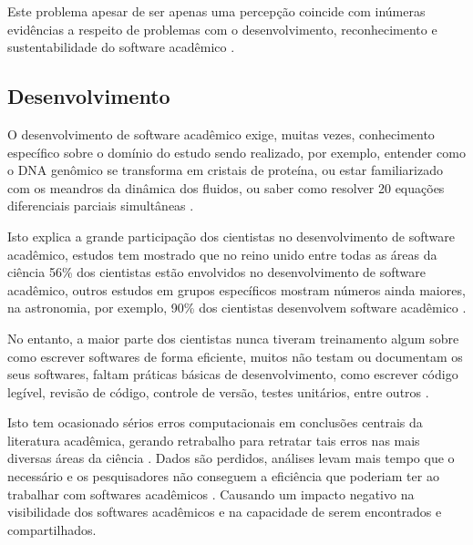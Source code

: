 Este problema apesar de ser apenas uma percepção coincide com inúmeras
evidências a respeito de problemas com o desenvolvimento, reconhecimento e
sustentabilidade do software acadêmico \cite{allen2017engineering}.


\subsection{Desenvolvimento}

O desenvolvimento de software acadêmico exige, muitas vezes, conhecimento
específico sobre o domínio do estudo sendo realizado,
por exemplo, entender como o DNA genômico
se transforma em cristais de proteína, ou estar familiarizado com os meandros
da dinâmica dos fluidos, ou saber como resolver 20 equações diferenciais
parciais simultâneas \cite{segal2008developing}.

Isto explica a grande participação dos cientistas no desenvolvimento de
software acadêmico, estudos tem mostrado que no reino unido entre todas as
áreas da ciência 56\% dos cientistas estão envolvidos no desenvolvimento de
software acadêmico, outros estudos em grupos específicos mostram números ainda
maiores, na astronomia, por exemplo, 90\% dos cientistas desenvolvem software
acadêmico \cite{hettrick_2014_14809, momcheva2015software}.

No entanto, a maior parte dos cientistas nunca tiveram treinamento algum sobre como escrever
softwares de forma eficiente, muitos não testam ou documentam os seus
softwares, faltam práticas básicas de desenvolvimento, como escrever código
legível, revisão de código, controle de versão, testes unitários, entre outros
\cite{wilson2017good}.

Isto tem ocasionado sérios erros computacionais em conclusões centrais da
literatura acadêmica, gerando retrabalho para retratar tais erros nas mais
diversas áreas da ciência \cite{Merali2010Computational}. Dados são perdidos,
análises levam mais tempo que o necessário e os pesquisadores não conseguem a
eficiência que poderiam ter ao trabalhar com softwares acadêmicos
\cite{wilson2017good}.  Causando um impacto negativo na visibilidade dos
softwares acadêmicos \cite{howison2013, katz2014transitive} e na capacidade de
serem encontrados e compartilhados.

